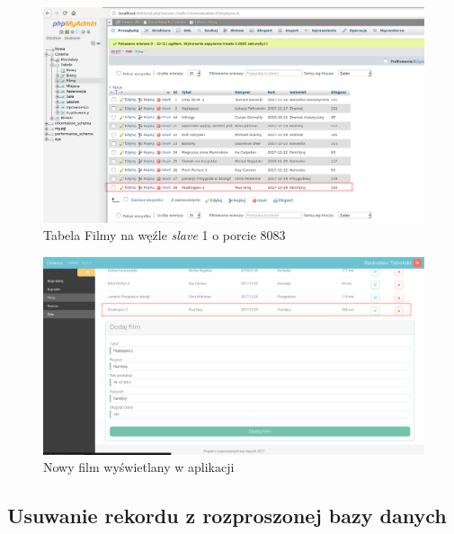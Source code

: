 \begin{figure} [H]
	\centering
	\includegraphics[width=1\linewidth]{rozdzial06/8.png}
	\caption{Tabela Filmy na węźle \textit{slave} 1 o porcie 8083}
	\label{fig:FilmSlave}
\end{figure}

\begin{figure} [H]
	\centering
	\includegraphics[width=1\linewidth]{rozdzial06/6.png}
	\caption{Nowy film wyświetlany w aplikacji}
	\label{fig:endAddFilm}
\end{figure}

\subsection{Usuwanie rekordu z rozproszonej bazy danych}




